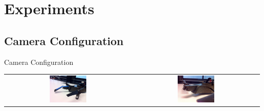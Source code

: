 \documentclass{beamer}
\begin{document}
\section{Experiments}
\subsection{Camera Configuration}
\begin{frame}
\begin{block}{Camera Configuration}
\begin{center}
\begin{tabular}{c c}
\includegraphics[width = 0.3\textwidth]{images/ardrone_mirror.jpg} & \includegraphics[width = 0.3\textwidth]{images/ardrone_modification.jpg}
\end{tabular}
\end{center}
\end{block}
\end{frame}
\end{document}
